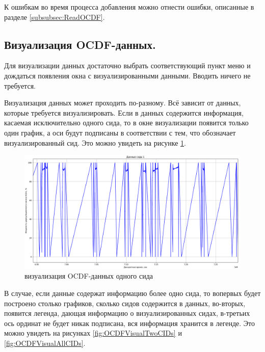{  \par К ошибкам во время процесса добавления можно отнести ошибки, описанные в разделе \ref{subsubsec:ReadOCDF}.

  \par 
}

\subsection{ \standartTitleFont
  Визуализация OCDF-данных.
} \label{subsubsec:OCDFVisual}

{\standartFont

  \par Для визуализации данных достаточно выбрать соответствующий пункт меню и дождаться появления окна с визуализированными данными. Вводить ничего не требуется. 

  \par Визуализация данных может проходить по-разному. Всё зависит от данных, которые требуется визуализировать. Если в данных содержится информация, касаемая исключительно одного сида, то в окне визуализации появится только один график, а оси будут подписаны в соответствии с тем, что обозначает визуализированный сид. Это можно увидеть на рисунке \ref{fig:OCDFVisualOneCID}.

  \begin{figure}[H]
    \centering
    \includegraphics[width=\textwidth]{images/forDataManipulator/OCDFVisualOneCID.png}
    \caption{визуализация OCDF-данных одного сида} 
    \label{fig:OCDFVisualOneCID}
  \end{figure}

  \par В случае, если данные содержат информацию более одно сида, то вопервых будет построено столько графиков, сколько сидов содержится в данных, во-вторых, появится легенда, дающая информацию о визуализированных сидах, в-третьих ось ординат не будет никак подписана, вся информация хранится в легенде. Это можно увидеть на рисунках \ref{fig:OCDFVisualTwoCIDs} и \ref{fig:OCDFVisualAllCIDs}.

}

